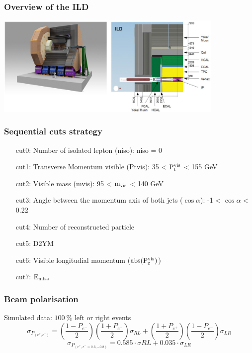 \documentclass{beamer}
\begin{document}
\begin{frame}[plain]
    \frametitle{Overview of the ILD}

    \begin{center}
        \includegraphics[width = 11cm]{Pictures/ild-detector-ilc.jpg}
    \end{center}
\end{frame}

\begin{frame}[plain,label=cuts]
  \frametitle{Sequential cuts strategy}
      \begin{enumerate}
          \item [cut0:] Number of isolated lepton (niso): niso = 0 %
          \item [cut1:] Transverse Momentum visible (Ptvis): 35 < $\rm{P_{t}^{vis}}$ < 155 GeV
          \item [cut2:] Visible mass (mvis): 95 < $\rm{m_{vis}}$ < 140 GeV
          \item [cut3:] Angle between the momentum axis of both jets ($\cos{\alpha}$): -1 < $\cos{\alpha}$ < 0.22
          \item [cut4:] Number of reconstructed particle 
          \item [cut5:] D2YM
          \item [cut6:] Visible longitudial momentum ($\rm{abs(P_{z}^{vis})}$)
          \item [cut7:] $\rm{E_{miss}}$
      \end{enumerate}
\end{frame}

  \begin{frame}[plain]
    \frametitle{Beam polarisation}

    \begin{block}{Simulated data: $100~\%$ left or right events}
      \footnotesize{
      \[ \sigma_{P_{(e^+,e^-)}} = \left( \frac{1-P_{e^-}}{2} \right) \left( \frac{1+P_{e^+}}{2} \right) \sigma_{RL} + \left( \frac{1+P_{e^+}}{2} \right) \left( \frac{1-P_{e^-}}{2} \right) \sigma_{LR} \]
      \[ \sigma_{P_{(e^+,e^- = 0.3, -0.8)}} = 0.585 \cdot \sigma{RL} + 0.035 \cdot \sigma_{LR} \]
      }
    \end{block}
  \end{frame}
\end{document}
